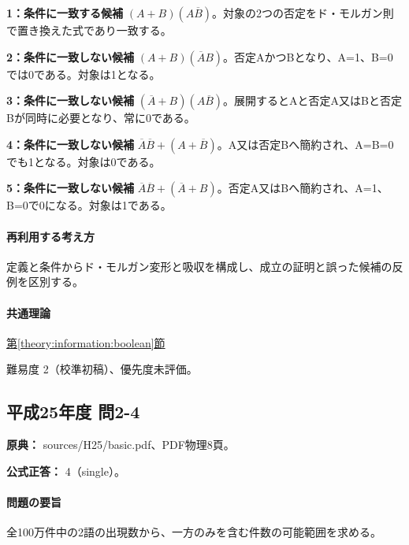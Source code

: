 \noindent\textbf{1：条件に一致する候補} \((A+B)(A\overline B)\)。対象の2つの否定をド・モルガン則で置き換えた式であり一致する。\par

\noindent\textbf{2：条件に一致しない候補} \((A+B)(\overline A B)\)。否定AかつBとなり、A=\allowbreak{}1、B=\allowbreak{}0では0である。対象は1となる。\par

\noindent\textbf{3：条件に一致しない候補} \((\overline A+B)(A\overline B)\)。展開するとAと否定A又はBと否定Bが同時に必要となり、常に0である。\par

\noindent\textbf{4：条件に一致しない候補} \(\overline A\overline B+(A+\overline B)\)。A又は否定Bへ簡約され、A=\allowbreak{}B=\allowbreak{}0でも1となる。対象は0である。\par

\noindent\textbf{5：条件に一致しない候補} \(\overline A\overline B+(\overline A+B)\)。否定A又はBへ簡約され、A=\allowbreak{}1、B=\allowbreak{}0で0になる。対象は1である。\par

\paragraph{再利用する考え方} 定義と条件からド・モルガン変形と吸収を構成し、成立の証明と誤った候補の反例を区別する。

\paragraph{共通理論} \hyperref[theory:information:boolean]{第\ref*{theory:information:boolean}節}

\par 難易度 2（校準初稿）、優先度未評価。

\subsection{平成25年度 問2-4}
\label{q:h25-reg-basic-2-4}

\noindent\textbf{原典：} sources/H25/basic.pdf、PDF物理8頁。

\textbf{公式正答：} 4（single）。

\paragraph{問題の要旨} 全100万件中の2語の出現数から、一方のみを含む件数の可能範囲を求める。

